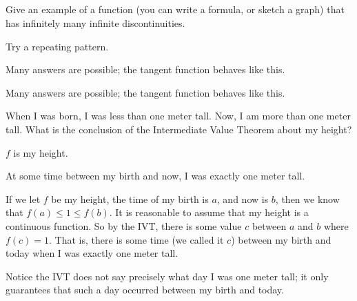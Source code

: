 %
%

\subsection*{\Conceptual}

\begin{question}Give an example of a function (you can write a formula, or sketch a graph) that has infinitely many infinite discontinuities.
\end{question}
\begin{hint} Try a repeating pattern.
\end{hint}
\begin{answer} Many answers are possible; the tangent function behaves like this.
\end{answer}
\begin{solution} Many answers are possible; the tangent function behaves like this.
\end{solution}


\begin{question}
When I was born, I was less than one meter tall. Now, I am more than one meter tall.
What is the conclusion of the Intermediate Value Theorem about my height?
\end{question}
\begin{hint} $f$ is my height.
\end{hint}
\begin{answer} At some time between my birth and now, I was exactly one meter tall.
\end{answer}
\begin{solution} If we let $f$ be my height, the time of my birth is $a$, and now is $b$, then we know that $f(a) \leq 1 \leq f(b)$. It is reasonable to assume that my height is a continuous function. So by the IVT, there is some value $c$ between $a$ and $b$ where $f(c)=1$. That is, there is some time (we called it $c$) between my birth and today when I was exactly one meter tall.

Notice the IVT does not say precisely what day I was one meter tall; it only guarantees that such a day occurred between my birth and today.
\end{solution}


